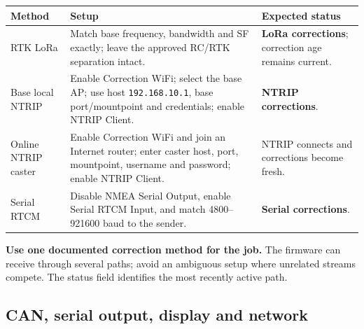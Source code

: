\documentclass[
  10pt,
  letterpaper,
  openany]{report}
\newcounter{none} %
\begin{document}
{\def\LTcaptype{none} %
\begin{longtable}[]{@{}
  >{\raggedright\arraybackslash}p{}
  >{\raggedright\arraybackslash}p{}
  >{\raggedright\arraybackslash}p{}@{}}
\toprule\noalign{}
\begin{minipage}[b]{\linewidth}\raggedright
Method
\end{minipage} & \begin{minipage}[b]{\linewidth}\raggedright
Setup
\end{minipage} & \begin{minipage}[b]{\linewidth}\raggedright
Expected status
\end{minipage} \\
\midrule\noalign{}
\endhead
\bottomrule\noalign{}
\endlastfoot
RTK LoRa & Match base frequency, bandwidth and SF exactly; leave the
approved RC/RTK separation intact. & \textbf{LoRa corrections};
correction age remains current. \\
Base local NTRIP & Enable Correction WiFi; select the base AP; use host
\texttt{192.168.10.1}, base port/mountpoint and credentials; enable
NTRIP Client. & \textbf{NTRIP corrections}. \\
Online NTRIP caster & Enable Correction WiFi and join an Internet
router; enter caster host, port, mountpoint, username and password;
enable NTRIP Client. & NTRIP connects and corrections become fresh. \\
Serial RTCM & Disable NMEA Serial Output, enable Serial RTCM Input, and
match 4800--921600 baud to the sender. & \textbf{Serial corrections}. \\
\end{longtable}
}

\begin{manualwarning}

\textbf{Use one documented correction method for the job.} The firmware
can receive through several paths; avoid an ambiguous setup where
unrelated streams compete. The status field identifies the most recently
active path.

\end{manualwarning}

\subsection{CAN, serial output, display and
network}\label{can-serial-output-display-and-network}
\end{document}
